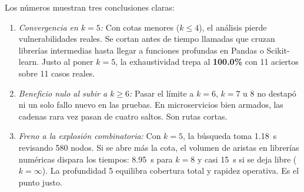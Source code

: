 \documentclass[conference]{IEEEtran}
\begin{document}
\begin{table}[!htbp]
\centering
\caption{Análisis de Sensibilidad de la Cota de Profundidad $k$ frente a Exhaustividad y Rendimiento}
\label{tab:sensibilidad_k}
\small
{}
\end{table}

Los números muestran tres conclusiones claras:
\begin{enumerate}
    \item \textit{Convergencia en $k=5$:} Con cotas menores ($k \le 4$), el análisis pierde vulnerabilidades reales. Se cortan antes de tiempo llamadas que cruzan librerías intermedias hasta llegar a funciones profundas en Pandas o Scikit-learn. Justo al poner $k=5$, la exhaustividad trepa al \textbf{100.0\%} con 11 aciertos sobre 11 casos reales.
    \item \textit{Beneficio nulo al subir a $k \ge 6$:} Pasar el límite a $k=6$, $k=7$ u 8 no destapó ni un solo fallo nuevo en las pruebas. En microservicios bien armados, las cadenas rara vez pasan de cuatro saltos. Son rutas cortas.
    \item \textit{Freno a la explosión combinatoria:} Con $k=5$, la búsqueda toma 1.18~s revisando 580 nodos. Si se abre más la cota, el volumen de aristas en librerías numéricas dispara los tiempos: 8.95~s para $k=8$ y casi 15~s si se deja libre ($k=\infty$). La profundidad 5 equilibra cobertura total y rapidez operativa. Es el punto justo.
\end{enumerate}
\end{document}
